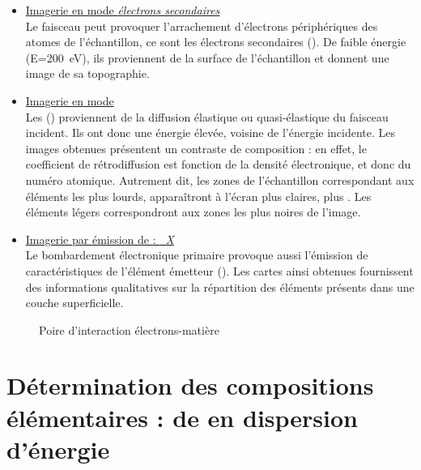 \begin{itemize}
  \item \uline{Imagerie en mode \emph{électrons secondaires}}\\
        Le faisceau peut provoquer l'arrachement d'électrons 
        périphériques des atomes de l'échantillon, ce sont les 
        électrons secondaires (). De faible énergie 
        (E=\SI{200}{\electronvolt}), ils proviennent de la surface 
        de l'échantillon et donnent une image de sa topographie. 
  \item \uline{Imagerie en mode \emph{\ERD}}\\ 
        Les \ERD () proviennent de la diffusion 
        élastique ou quasi-élastique du faisceau incident. Ils ont 
        donc une énergie élevée, voisine de l'énergie incidente. 
        Les images obtenues présentent un contraste de composition : 
        en effet, le coefficient de rétrodiffusion est fonction de 
        la densité électronique, et donc du numéro atomique. 
        Autrement dit, les zones de l'échantillon correspondant aux 
        éléments les plus lourds, apparaîtront à l'écran plus claires, 
        plus . Les éléments légers correspondront 
        aux zones les plus noires de l'image.
  \item \uline{Imagerie par émission de \RX : \emph{\carto~X}}\\
        Le bombardement électronique primaire provoque aussi 
        l'émission de \RX caractéristiques de l'élément émetteur 
        (). Les cartes ainsi obtenues fournissent des 
        informations qualitatives sur la répartition des éléments 
        présents dans une couche superficielle.
\end{itemize}

\begin{figure}[htb]
  \caption[Poire d'interaction électrons-matière]
          {Poire d'interaction électrons-matière 
           \autocite[d'après][]{web_MEB}}
  \label{fig:meb}
\end{figure}

\section{Détermination des compositions élémentaires : \spectro de 
         \RX en dispersion d'énergie}

